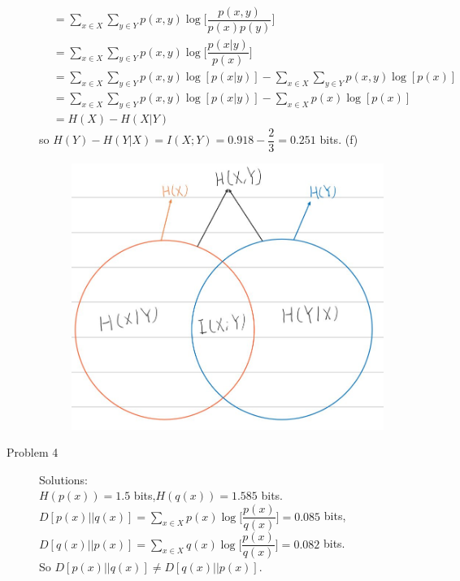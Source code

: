 \documentclass[11pt]{article}
\begin{document}
\begin{description}
\[\begin{aligned}
                                &=\displaystyle\sum_{x\in X}\sum_{y\in Y}p(x,y)\log \big[\dfrac{p(x,y)}{p(x)p(y)}\big]\\
                                &=\displaystyle\sum_{x\in X}\sum_{y\in Y}p(x,y)\log \big[\dfrac{p(x|y)}{p(x)}\big]\\
                                &=\displaystyle\sum_{x\in X}\sum_{y\in Y}p(x,y)\log [p(x|y)]-\displaystyle\sum_{x\in X}\sum_{y\in Y}p(x,y)\log [p(x)]\\
                                &=\displaystyle\sum_{x\in X}\sum_{y\in Y}p(x,y)\log [p(x|y)]-\displaystyle\sum_{x\in X}p(x)\log [p(x)]\\
                                &=H(X)-H(X|Y)
                        \end{aligned}\]
                        so $H(Y)-H(Y|X)=I(X;Y)=0.918-\dfrac{2}{3}=0.251$ bits.
        \subitem(f)
            \begin{figure}[htbp]
            \centering
            \includegraphics[scale=0.3]{Venn_Diagram}
            \label{fig:figure1}
            \end{figure}
    \item[Problem 4] Solutions:\\
     $H(p(x))=1.5$ bits,\quad $H(q(x))=1.585$ bits.\\[8pt]
     $D[p(x)||q(x)]=\displaystyle\sum_{x\in X}p(x)\log \big[\dfrac{p(x)}{q(x)}\big]=0.085$ bits, $D[q(x)||p(x)]=\displaystyle\sum_{x\in X}q(x)\log \big[\dfrac{p(x)}{q(x)}\big]=0.082$ bits.\\[8pt]So $D[p(x)||q(x)]\neq D[q(x)||p(x)]$.

\end{description}
\end{document}

